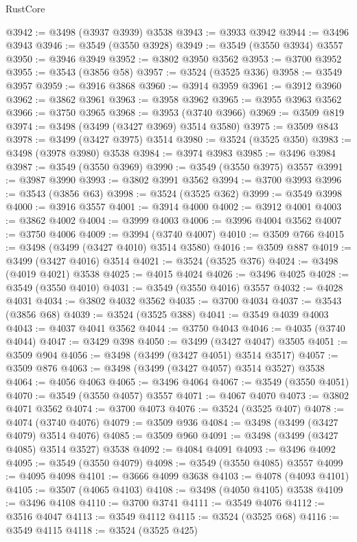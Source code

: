 \begin{lexlean}{RustCore}
\begin{coremodule}
@3942 := @3498 (@3937 @3939) @3538
@3943 := @3933 @3942
@3944 := @3496 @3943
@3946 := @3549 (@3550 @3928)
@3949 := @3549 (@3550 @3934) @3557
@3950 := @3946 @3949
@3952 := @3802 @3950 @3562
@3953 := @3700 @3952
@3955 := @3543 (@3856 @58)
@3957 := @3524 (@3525 @336)
@3958 := @3549 @3957
@3959 := @3916 @3868
@3960 := @3914 @3959
@3961 := @3912 @3960
@3962 := @3862 @3961
@3963 := @3958 @3962
@3965 := @3955 @3963 @3562
@3966 := @3750 @3965
@3968 := @3953 (@3740 @3966)
@3969 := @3509 @819
@3974 := @3498 (@3499 (@3427 @3969) @3514 @3580)
@3975 := @3509 @843
@3978 := @3499 (@3427 @3975) @3514
@3980 := @3524 (@3525 @350)
@3983 := @3498 (@3978 @3980) @3538
@3984 := @3974 @3983
@3985 := @3496 @3984
@3987 := @3549 (@3550 @3969)
@3990 := @3549 (@3550 @3975) @3557
@3991 := @3987 @3990
@3993 := @3802 @3991 @3562
@3994 := @3700 @3993
@3996 := @3543 (@3856 @63)
@3998 := @3524 (@3525 @362)
@3999 := @3549 @3998
@4000 := @3916 @3557
@4001 := @3914 @4000
@4002 := @3912 @4001
@4003 := @3862 @4002
@4004 := @3999 @4003
@4006 := @3996 @4004 @3562
@4007 := @3750 @4006
@4009 := @3994 (@3740 @4007)
@4010 := @3509 @766
@4015 := @3498 (@3499 (@3427 @4010) @3514 @3580)
@4016 := @3509 @887
@4019 := @3499 (@3427 @4016) @3514
@4021 := @3524 (@3525 @376)
@4024 := @3498 (@4019 @4021) @3538
@4025 := @4015 @4024
@4026 := @3496 @4025
@4028 := @3549 (@3550 @4010)
@4031 := @3549 (@3550 @4016) @3557
@4032 := @4028 @4031
@4034 := @3802 @4032 @3562
@4035 := @3700 @4034
@4037 := @3543 (@3856 @68)
@4039 := @3524 (@3525 @388)
@4041 := @3549 @4039 @4003
@4043 := @4037 @4041 @3562
@4044 := @3750 @4043
@4046 := @4035 (@3740 @4044)
@4047 := @3429 @398
@4050 := @3499 (@3427 @4047) @3505
@4051 := @3509 @904
@4056 := @3498 (@3499 (@3427 @4051) @3514 @3517)
@4057 := @3509 @876
@4063 := @3498 (@3499 (@3427 @4057) @3514 @3527) @3538
@4064 := @4056 @4063
@4065 := @3496 @4064
@4067 := @3549 (@3550 @4051)
@4070 := @3549 (@3550 @4057) @3557
@4071 := @4067 @4070
@4073 := @3802 @4071 @3562
@4074 := @3700 @4073
@4076 := @3524 (@3525 @407)
@4078 := @4074 (@3740 @4076)
@4079 := @3509 @936
@4084 := @3498 (@3499 (@3427 @4079) @3514 @4076)
@4085 := @3509 @960
@4091 := @3498 (@3499 (@3427 @4085) @3514 @3527) @3538
@4092 := @4084 @4091
@4093 := @3496 @4092
@4095 := @3549 (@3550 @4079)
@4098 := @3549 (@3550 @4085) @3557
@4099 := @4095 @4098
@4101 := @3666 @4099 @3638
@4103 := @4078 (@4093 @4101)
@4105 := @3507 (@4065 @4103)
@4108 := @3498 (@4050 @4105) @3538
@4109 := @3496 @4108
@4110 := @3700 @3741
@4111 := @3549 @4076
@4112 := @3516 @4047
@4113 := @3549 @4112
@4115 := @3524 (@3525 @68)
@4116 := @3549 @4115
@4118 := @3524 (@3525 @425)

\end{coremodule}
\end{lexlean}
